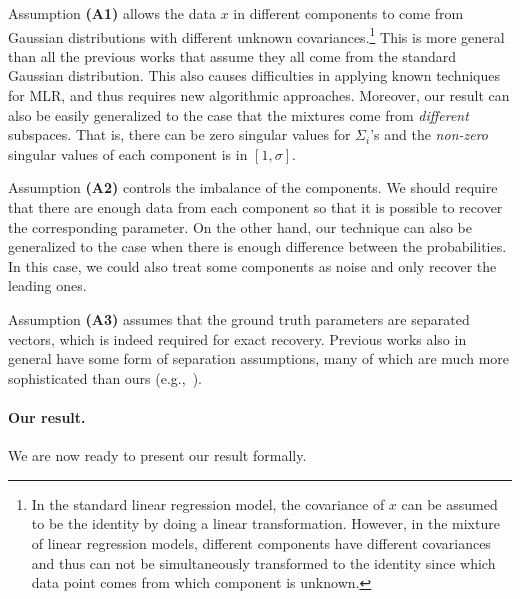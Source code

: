Assumption \textbf{(A1)} allows the data $x$ in different components to come from Gaussian distributions with different unknown covariances.\footnote{In the standard linear regression model, the covariance of $x$ can be assumed to be the identity by doing a linear transformation. However, in the mixture of linear regression models, different components have different covariances and thus can not be simultaneously transformed to the identity since which data point comes from which component is unknown.}
This is more general than all the previous works that assume they all come from the standard Gaussian distribution. This also causes difficulties in applying known techniques for MLR, and thus requires new algorithmic approaches.  Moreover, our result can also be easily generalized to the case that the mixtures come from \emph{different} subspaces. That is, there can be zero singular values for $\Sigma_i$'s and the \emph{non-zero} singular values of each component is in $[1, \sigma]$. 

Assumption \textbf{(A2)} controls the imbalance of the components. We should require that there are enough data from each component so that it is possible to recover the corresponding parameter. On the other hand, our technique can also be generalized to the case when there is enough difference between the probabilities. In this case, we could also treat some components as noise and only recover the leading ones. 

Assumption \textbf{(A3)} assumes that the ground truth parameters are separated vectors, which is indeed required for exact recovery. Previous works also in general have some form of separation assumptions, many of which are much more sophisticated than ours (e.g.,~\citep{zhong2016mixed,yi2016solving}). 

\paragraph{Our result.} 
We are now ready to present our result formally.

